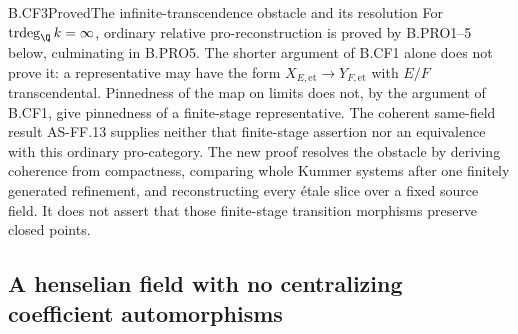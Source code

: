 \begin{claim}{B.CF3}{Proved}{The infinite-transcendence obstacle and its resolution}
For \(\operatorname{trdeg}_{\Q}k=\infty\), ordinary relative
pro-reconstruction is proved by B.PRO1--5 below, culminating in
B.PRO5. The shorter argument of B.CF1 alone does not prove it:
a representative may have the form
\(X_{E,\mathrm{et}}\to Y_{F,\mathrm{et}}\) with \(E/F\)
transcendental. Pinnedness of the map on limits does not, by the
argument of B.CF1, give pinnedness of a finite-stage representative.
The coherent same-field result AS-FF.13 supplies neither that
finite-stage assertion nor an equivalence with this ordinary
pro-category. The new proof resolves the obstacle by deriving
coherence from compactness, comparing whole Kummer systems after
one finitely generated refinement, and reconstructing every étale
slice over a fixed source field. It does not assert that those
finite-stage transition morphisms preserve closed points.
\end{claim}

\subsection{A henselian field with no centralizing coefficient automorphisms}

